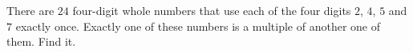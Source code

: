 There are $24$ four-digit whole numbers that use each of the four digits $2$, $4$, $5$ and $7$ exactly once. Exactly one of these numbers is a multiple of another one of them. Find it.
